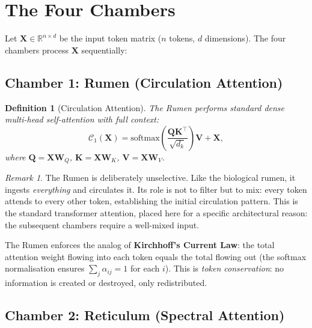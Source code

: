 \documentclass[twocolumn,10pt]{article}
\newtheorem{definition}[theorem]{Definition}
\theoremstyle{remark}
\newtheorem{remark}[theorem]{Remark}
\newcommand{\chamber}[1]{\mathcal{C}_{#1}}
\begin{document}
\section{The Four Chambers}
\label{sec:chambers}

Let $\mathbf{X} \in \mathbb{R}^{n \times d}$ be the input token matrix ($n$ tokens, $d$ dimensions).  The four chambers process $\mathbf{X}$ sequentially:

\subsection{Chamber 1: Rumen (Circulation Attention)}
\label{sec:rumen}

\begin{definition}[Circulation Attention]
\label{def:circulation}
The Rumen performs standard dense multi-head self-attention with full context:
\begin{equation}
    \chamber{1}(\mathbf{X}) = \text{softmax}\!\left(\frac{\mathbf{Q}\mathbf{K}^\top}{\sqrt{d_k}}\right)\mathbf{V} + \mathbf{X},
    \label{eq:rumen}
\end{equation}
where $\mathbf{Q} = \mathbf{X}\mathbf{W}_Q$, $\mathbf{K} = \mathbf{X}\mathbf{W}_K$, $\mathbf{V} = \mathbf{X}\mathbf{W}_V$.
\end{definition}

\begin{remark}
The Rumen is deliberately unselective.  Like the biological rumen, it ingests \emph{everything} and circulates it.  Its role is not to filter but to mix: every token attends to every other token, establishing the initial circulation pattern.  This is the standard transformer attention, placed here for a specific architectural reason: the subsequent chambers require a well-mixed input.
\end{remark}

The Rumen enforces the analog of \textbf{Kirchhoff's Current Law}: the total attention weight flowing into each token equals the total flowing out (the softmax normalisation ensures $\sum_j \alpha_{ij} = 1$ for each $i$).  This is \emph{token conservation}: no information is created or destroyed, only redistributed.


\subsection{Chamber 2: Reticulum (Spectral Attention)}
\label{sec:spectral}
\end{document}
